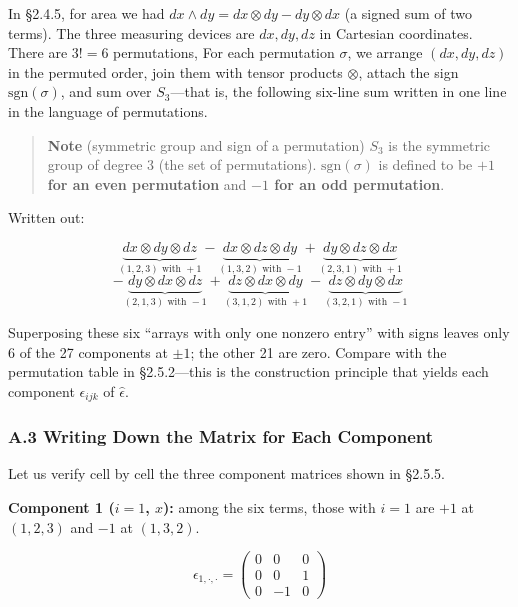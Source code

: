 In §2.4.5, for area we had
\(dx \wedge dy = dx \otimes dy - dy \otimes dx\) (a signed sum of two
terms). The three measuring devices are \(dx, dy, dz\) in Cartesian
coordinates. There are \(3! = 6\) permutations, For each permutation
\(\sigma\), we arrange \((dx,dy,dz)\) in the permuted order, join them
with tensor products \(\otimes\), attach the sign
\(\mathrm{sgn}(\sigma)\), and sum over \(S_3\)---that is, the following
six-line sum written in one line in the language of permutations.

\begin{quote}
\textbf{Note} (symmetric group and sign of a permutation) \(S_3\) is the
symmetric group of degree 3 (the set of permutations).
\(\mathrm{sgn}(\sigma)\) is defined to be
\textbf{$+1$ for an even permutation} and
\textbf{$-1$ for an odd permutation}.
\end{quote}

Written out:

\[\underbrace{dx \otimes dy \otimes dz}_{(1,2,3)\text{ with }+1} - \underbrace{dx \otimes dz \otimes dy}_{(1,3,2)\text{ with }-1} + \underbrace{dy \otimes dz \otimes dx}_{(2,3,1)\text{ with }+1}\]
\[- \underbrace{dy \otimes dx \otimes dz}_{(2,1,3)\text{ with }-1} + \underbrace{dz \otimes dx \otimes dy}_{(3,1,2)\text{ with }+1} - \underbrace{dz \otimes dy \otimes dx}_{(3,2,1)\text{ with }-1}\]

Superposing these six ``arrays with only one nonzero entry'' with signs
leaves only 6 of the 27 components at \(\pm 1\); the other 21 are zero.
Compare with the permutation table in §2.5.2---this is the construction
principle that yields each component \(\epsilon_{ijk}\) of
\(\widehat{\epsilon}\).

\hypertarget{a.3-writing-down-the-matrix-for-each-component}{%
\subsubsection{A.3 Writing Down the Matrix for Each
Component}\label{a.3-writing-down-the-matrix-for-each-component}}

Let us verify cell by cell the three component matrices shown in §2.5.5.

\textbf{Component 1 (\(i=1\), \(x\)):} among the six terms, those with
\(i = 1\) are \(+1\) at \((1,2,3)\) and \(-1\) at \((1,3,2)\).

\[\epsilon_{1,\cdot,\cdot} = \begin{pmatrix} 0 & 0 & 0 \\ 0 & 0 & 1 \\ 0 & -1 & 0 \end{pmatrix}\]

